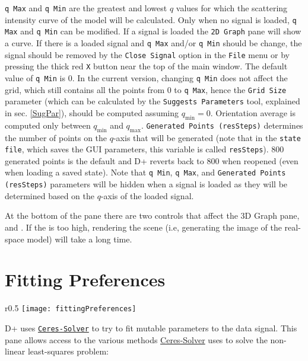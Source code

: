 \documentclass[../D+Manual.tex]{subfiles}
\begin{document}
\texttt{q Max} and \texttt{q Min} are the greatest and lowest $q$ values for which the scattering intensity curve of the model will be calculated.
Only when no signal is loaded, \texttt{q Max} and \texttt{q Min} can be modified. If a signal is loaded the \texttt{2D Graph} pane will show a curve. If there is a loaded signal and \texttt{q Max} and/or \texttt{q Min} should be change, the signal should be removed by the \texttt{Close Signal} option in the \texttt{File} menu or by pressing the thick red \texttt{X} button near the top of the main window.  
The default value of \texttt{q Min} is $0$. In the current version, changing \texttt{q Min} does not affect the grid, which still contains all the points from 0 to \texttt{q Max}, hence the \texttt{Grid Size} parameter (which can be calculated by the  \texttt{Suggests Parameters} tool, explained in sec. \ref{SugPar}), should be computed assuming $q_{\text{min}} = 0$. Orientation average is computed only between $q_{\text{min}}$ and $q_{\text{max}}$. \texttt{Generated Points (resSteps)} determines the number of points on the $q$-axis that will be generated (note that in the \texttt{state file}, which saves the GUI parameters, this variable is called \texttt{resSteps}). 800 generated points is the default and D+ reverts back to 800 when reopened (even when loading a saved state). Note that \texttt{q Min}, \texttt{q Max}, and \texttt{Generated Points (resSteps)} parameters will be hidden when a signal is loaded as they will be determined based on the $q$-axis of the loaded signal. 

At the bottom of the pane there are two controls that affect the 3D Graph pane,  and . If the  is too high, rendering the scene (i.e, generating the image of the real-space model) will take a long time. 

\section{Fitting Preferences} \label{sec:fittingPreferences}

\begin{wrapfigure}{r}{0.5\textwidth}
	\vspace{-20pt}
	\centering
    \texttt{[image: fittingPreferences]}
	\vspace{-10pt}
\end{wrapfigure}

D+ uses \href{http://ceres-solver.org/nnls_tutorial.html#}{\texttt{Ceres-Solver}} to try to fit mutable parameters to the data signal. This pane allows access to the various methods \href{http://ceres-solver.org/}{Ceres-Solver} uses to solve the non-linear least-squares problem:
\end{document}
